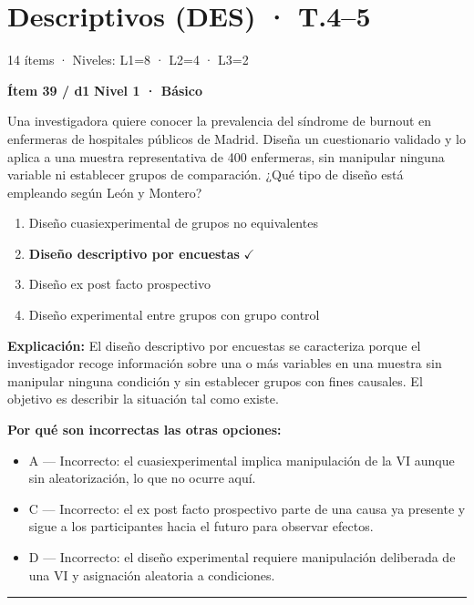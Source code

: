 \documentclass[12pt,a4paper]{article}
\begin{document}
\section{Descriptivos (DES) · T.4--5}
{\small\color{gris} 14 ítems · Niveles: L1=8 · L2=4 · L3=2}

\begin{mdframed}[backgroundcolor=fondogris,linecolor=azul,linewidth=1pt,innerleftmargin=10pt,innerrightmargin=10pt,innertopmargin=7pt,innerbottommargin=7pt]
\textbf{Ítem 39 / d1} \hfill {\small\bfseries\color{azul} Nivel 1 · Básico}
\end{mdframed}

Una investigadora quiere conocer la prevalencia del síndrome de burnout en enfermeras de hospitales públicos de Madrid. Diseña un cuestionario validado y lo aplica a una muestra representativa de 400 enfermeras, sin manipular ninguna variable ni establecer grupos de comparación. ¿Qué tipo de diseño está empleando según León y Montero?

\begin{enumerate}
  \item[A.] Diseño cuasiexperimental de grupos no equivalentes
  \item[\textbf{\color{verde}B.}] \textbf{\color{verde} Diseño descriptivo por encuestas} \hfill $\checkmark$
  \item[C.] Diseño ex post facto prospectivo
  \item[D.] Diseño experimental entre grupos con grupo control
\end{enumerate}

\noindent\textbf{\color{azul}Explicación:} El diseño descriptivo por encuestas se caracteriza porque el investigador recoge información sobre una o más variables en una muestra sin manipular ninguna condición y sin establecer grupos con fines causales. El objetivo es describir la situación tal como existe.

\noindent\textbf{\color{gris}Por qué son incorrectas las otras opciones:}
\begin{itemize}
  \item {\small A — Incorrecto: el cuasiexperimental implica manipulación de la VI aunque sin aleatorización, lo que no ocurre aquí.}
  \item {\small C — Incorrecto: el ex post facto prospectivo parte de una causa ya presente y sigue a los participantes hacia el futuro para observar efectos.}
  \item {\small D — Incorrecto: el diseño experimental requiere manipulación deliberada de una VI y asignación aleatoria a condiciones.}
\end{itemize}
\vspace{8pt}\hrule\vspace{10pt}
\end{document}
